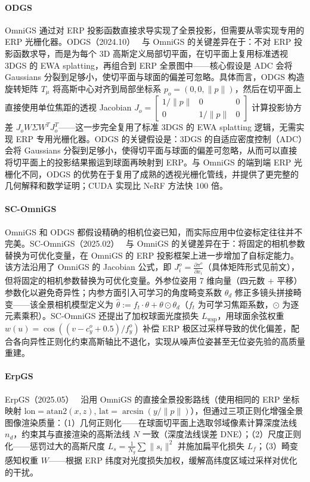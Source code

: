 \paragraph{ODGS}
OmniGS 通过对 ERP 投影函数直接求导实现了全景投影，但需要从零实现专用的 ERP 光栅化器。ODGS（2024.10）~\cite{2410_20686} 与 OmniGS 的关键差异在于：不对 ERP 投影函数求导，而是为每个 3D 高斯定义局部切平面，在切平面上复用标准透视 3DGS 的 EWA splatting，再组合到 ERP 全景图中——核心假设是 ADC 会将 Gaussians 分裂到足够小，使切平面与球面的偏差可忽略。具体而言，ODGS 构造旋转矩阵 $T_\mu$ 将高斯中心对齐到局部坐标系 $p_o = (0, 0, \|p\|)$，然后在切平面上直接使用单位焦距的透视 Jacobian $J_o = \begin{bmatrix} 1/\|p\| & 0 & 0 \\ 0 & 1/\|p\| & 0 \end{bmatrix}$ 计算投影协方差 $J_o W \Sigma W^T J_o^T$——这一步完全复用了标准 3DGS 的 EWA splatting 逻辑，无需实现 ERP 专用光栅化器。ODGS 的关键假设是：3DGS 的自适应密度控制（ADC）会将 Gaussians 分裂到足够小，使得切平面与球面的偏差可忽略，从而可以直接将切平面上的投影结果搬运到球面再映射到 ERP。与 OmniGS 的端到端 ERP 光栅化不同，ODGS 的优势在于复用了成熟的透视光栅化管线，并提供了更完整的几何解释和数学证明；CUDA 实现比 NeRF 方法快 100 倍。

\paragraph{SC-OmniGS}
OmniGS 和 ODGS 都假设精确的相机位姿已知，而实际应用中位姿标定往往并不完美。SC-OmniGS（2025.02）~\cite{2502_04734} 与 OmniGS 的关键差异在于：将固定的相机参数替换为可优化变量，在 OmniGS 的 ERP 投影框架上进一步增加了自标定能力。该方法沿用了 OmniGS 的 Jacobian 公式，即 $J_i^o = \frac{\partial \pi^o}{\partial x_i}$（具体矩阵形式见前文），但将固定的相机参数替换为可优化变量。外参位姿用 7 维向量（四元数 + 平移）参数化以避免奇异性；内参方面引入可学习的角度畸变系数 $\theta_d$ 修正多镜头拼接畸变——该全景相机模型定义为 $\hat{\theta} := f_t \cdot \theta + \theta \odot \theta_d$（$f_t$ 为可学习焦距系数，$\odot$ 为逐元素乘积）。SC-OmniGS 还提出了加权球面光度损失 $L_{\text{wsp}}$，用球面余弦权重 $w(u) = \cos((v - c_y^o + 0.5)/f_y^o)$ 补偿 ERP 极区过采样导致的优化偏差，配合各向异性正则化约束高斯轴比不退化，实现从噪声位姿甚至无位姿先验的高质量重建。

\paragraph{ErpGS}
ErpGS（2025.05）~\cite{2505_19883} 沿用 OmniGS 的直接全景投影路线（使用相同的 ERP 坐标映射 $\text{lon} = \text{atan2}(x, z)$, $\text{lat} = \arcsin(y/\|p\|)$），但通过三项正则化增强全景图像渲染质量：（1）几何正则化——在球面切平面上选取邻域像素计算深度法线 $n_d$，约束其与直接渲染的高斯法线 $N$ 一致（深度法线误差 DNE）；（2）尺度正则化——惩罚过大的高斯尺度 $L_s = \frac{1}{N_g}\sum\|s_i\|^2$ 并施加扁平化损失 $L_f$；（3）畸变感知权重 $W$——根据 ERP 纬度对光度损失加权，缓解高纬度区域过采样对优化的干扰。

